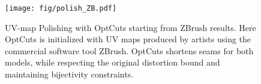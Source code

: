 \begin{figure}[t]
\centering
\texttt{[image: fig/polish\_ZB.pdf]}
\vspace{-0.3cm}
\caption{UV-map Polishing with OptCuts starting from ZBrush results. Here OptCuts is initialized with UV maps produced by artists using the commercial software tool ZBrush. OptCuts shortens seams for both models, while respecting the original distortion bound and maintaining bijectivity constraints.}
\vspace{-0.3cm}
\label{fig:polish_zbrush}
\end{figure}


